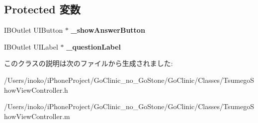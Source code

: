 \subsection*{Protected 変数}
\begin{DoxyCompactItemize}
\item 
\hypertarget{interface_tsumego_show_view_controller_a85b4635986bef0839198b33c8b073e54}{
IBOutlet UIButton $\ast$ {\bfseries \_\-showAnswerButton}}
\label{interface_tsumego_show_view_controller_a85b4635986bef0839198b33c8b073e54}

\item 
\hypertarget{interface_tsumego_show_view_controller_a65d53e8ff2038f00eeea1554c9b21b2f}{
IBOutlet UILabel $\ast$ {\bfseries \_\-questionLabel}}
\label{interface_tsumego_show_view_controller_a65d53e8ff2038f00eeea1554c9b21b2f}

\end{DoxyCompactItemize}


このクラスの説明は次のファイルから生成されました:\begin{DoxyCompactItemize}
\item 
/Users/inoko/iPhoneProject/GoClinic\_\-no\_\-GoStone/GoClinic/Classes/TsumegoShowViewController.h\item 
/Users/inoko/iPhoneProject/GoClinic\_\-no\_\-GoStone/GoClinic/Classes/TsumegoShowViewController.m\end{DoxyCompactItemize}

